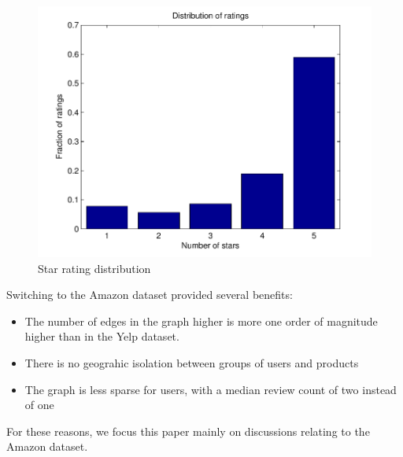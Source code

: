 \documentclass[letterpaper, 11 pt, conference]{ieeeconf}
\begin{document}
\begin{figure}[h]
\includegraphics[scale=0.6]{images/ratings.pdf}
\caption{Star rating distribution}
\label{fig:ratings}
\end{figure}


Switching to the Amazon dataset provided several benefits:
\begin{itemize}
\item The number of edges in the graph higher is more one order of magnitude 
higher than in the Yelp dataset.
\item There is no geograhic isolation between groups of users and products
\item The graph is less sparse for users, with a median review count of two 
instead of one
\end{itemize}
For these reasons, we focus this paper mainly on discussions relating to the 
Amazon dataset.

\end{document}
